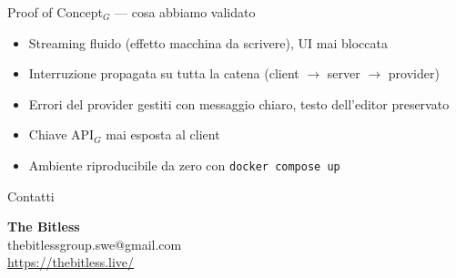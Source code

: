 \documentclass[aspectratio=169,11pt]{beamer}
\begin{document}
\begin{frame}{Proof of Concept$_G$ --- cosa abbiamo validato}
  \begin{itemize}
    \item[\textcolor{sbaccent}{\ensuremath{\checkmark}}] Streaming fluido (effetto macchina da scrivere), UI mai bloccata
    \item[\textcolor{sbaccent}{\ensuremath{\checkmark}}] Interruzione propagata su tutta la catena (client $\to$ server $\to$ provider)
    \item[\textcolor{sbaccent}{\ensuremath{\checkmark}}] Errori del provider gestiti con messaggio chiaro, testo dell'editor preservato
    \item[\textcolor{sbaccent}{\ensuremath{\checkmark}}] Chiave API$_G$ mai esposta al client
    \item[\textcolor{sbaccent}{\ensuremath{\checkmark}}] Ambiente riproducibile da zero con \texttt{docker compose up}
  \end{itemize}
\end{frame}

\begin{frame}{Contatti}
  \begin{center}
    {\Large\bfseries\color{sbnavy} The Bitless}\\[4pt]
    {\color{sbgray} thebitlessgroup.swe@gmail.com \\ \url{https://thebitless.live/}}
  \end{center}
\end{frame}
\end{document}
